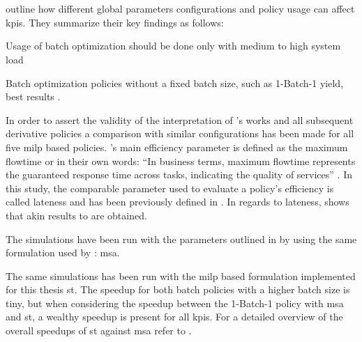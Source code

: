 \section{}
\label{sec:opt_results}

\citet[pp. 18--22]{Zeng2005} outline how different global parameters configurations and policy usage can affect \glspl{kpi}. They summarize their key findings as follows:
\begin{enumerate*}
	\item Usage of batch optimization should be done only with medium to high system load \citep[p. 24]{Zeng2005}
	\item Batch optimization policies without a fixed batch size, such as 1-Batch-1 yield, best results \citep[p. 24]{Zeng2005}.
\end{enumerate*}

In order to assert the validity of the interpretation of \citet{Zeng2005}'s works and all subsequent derivative policies a comparison with similar configurations has been made for all five \gls{milp} based policies. \citet{Zeng2005}'s main efficiency parameter is defined as the maximum flowtime or in their own words: ``In business terms, maximum flowtime represents the guaranteed response time across tasks, indicating the quality of services'' \citep[p. 17]{Zeng2005}. In this study, the comparable parameter used to evaluate a policy's efficiency is called lateness and has been previously defined in . In regards to lateness,  shows that akin results to \citet{Zeng2005} are obtained.


The simulations have been run with the parameters outlined in  by using the same formulation used by \citet{Zeng2005}: \gls{msa}.

The same simulations has been run with the \gls{milp} based formulation implemented for this thesis \ie \gls{st}. The speedup for both batch policies with a higher batch size is tiny, but when considering the speedup between the 1-Batch-1 policy with \gls{msa} and \gls{st}, a wealthy speedup is present for all \glspl{kpi}. For a detailed overview of the overall speedups of \gls{st} against \gls{msa} refer to .


